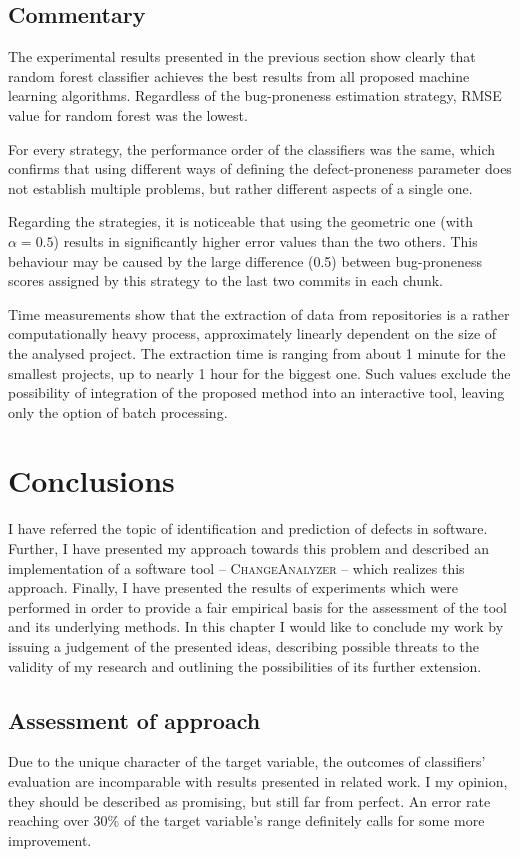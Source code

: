 \documentclass{pracamgr}
\begin{document}
\section{Commentary}
\label{sec:commentary}
The experimental results presented in the previous section show clearly that random forest classifier achieves the best results from all proposed machine learning algorithms. Regardless of the bug-proneness estimation strategy, RMSE value for random forest was the lowest.

For every strategy, the performance order of the classifiers was the same, which confirms that using different ways of defining the defect-proneness parameter does not establish multiple problems, but rather different aspects of a single one.

Regarding the strategies, it is noticeable that using the geometric one (with $\alpha = 0.5$) results in significantly higher error values than the two others. This behaviour may be caused by the large difference (0.5) between bug-proneness scores assigned by this strategy to the last two commits in each chunk.

Time measurements show that the extraction of data from repositories is a rather computationally heavy process, approximately linearly dependent on the size of the analysed project. The extraction time is ranging from about 1 minute for the smallest projects, up to nearly 1 hour for the biggest one. Such values exclude the possibility of integration of the proposed method into an interactive tool, leaving only the option of batch processing.

\chapter{Conclusions}
\label{cha:conclusions}
I have referred the topic of identification and prediction of defects in software. Further, I have presented my approach towards this problem and described an implementation of a software tool -- \textsc{ChangeAnalyzer} -- which realizes this approach. Finally, I have presented the results of experiments which were performed in order to provide a fair empirical basis for the assessment of the tool and its underlying methods. In this chapter I would like to conclude my work by issuing a judgement of the presented ideas, describing possible threats to the validity of my research and outlining the possibilities of its further extension.

\section{Assessment of approach}
\label{sec:assessment}
Due to the unique character of the target variable, the outcomes of classifiers' evaluation are incomparable with results presented in related work. I my opinion, they should be described as promising, but still far from perfect. An error rate reaching over 30\% of the target variable's range definitely calls for some more improvement.
\end{document}
